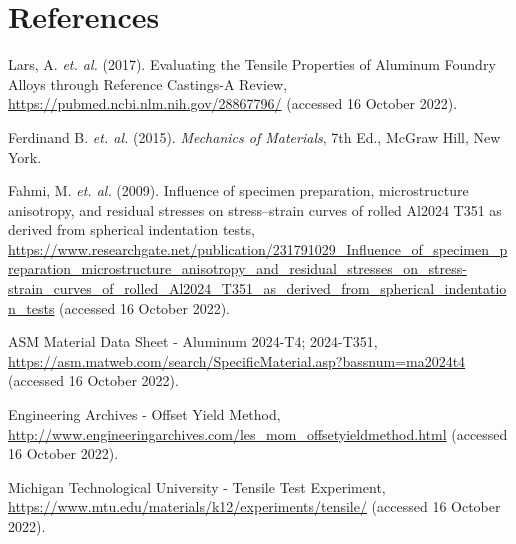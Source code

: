 \documentclass{article}
\begin{document}
    \section{References}
    \begin{description}
        
        \item Lars, A. \emph{et. al.} (2017). Evaluating the Tensile Properties of Aluminum Foundry Alloys through Reference Castings-A Review, \url{https://pubmed.ncbi.nlm.nih.gov/28867796/} (accessed 16 October 2022).
        \item Ferdinand B. \emph{et. al.} (2015). \emph{Mechanics of Materials}, 7th Ed., McGraw Hill, New York.
        \item Fahmi, M. \emph{et. al.} (2009). Influence of specimen preparation, microstructure anisotropy, and residual stresses on stress–strain curves of rolled Al2024 T351 as derived from spherical indentation tests, \url{https://www.researchgate.net/publication/231791029_Influence_of_specimen_preparation_microstructure_anisotropy_and_residual_stresses_on_stress-strain_curves_of_rolled_Al2024_T351_as_derived_from_spherical_indentation_tests} (accessed 16 October 2022).
        \item ASM Material Data Sheet - Aluminum 2024-T4; 2024-T351, \url{https://asm.matweb.com/search/SpecificMaterial.asp?bassnum=ma2024t4} (accessed 16 October 2022).
        \item Engineering Archives - Offset Yield Method, \url{http://www.engineeringarchives.com/les_mom_offsetyieldmethod.html} (accessed 16 October 2022).
        \item Michigan Technological University - Tensile Test Experiment, \url{https://www.mtu.edu/materials/k12/experiments/tensile/} (accessed 16 October 2022).
        
    \end{description}
    \newpage
\end{document}
